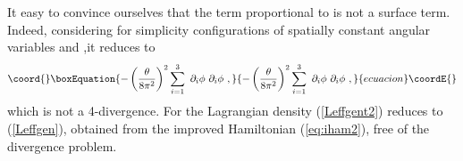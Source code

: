 \documentclass[a4paper,12pt]{article}
\begin{document}
It easy to convince ourselves that the term proportional to \coordHE{}
is not a surface term. Indeed, considering for simplicity configurations of
spatially constant angular variables \coordHE{} and
\coordHE{},it reduces to
\begin{equation}\coord{}\boxEquation{
-\left(\frac{\theta}{8\pi^2}\right)^2\sum_{i=1}^{3}\,\,
\partial_i\phi\,\, \partial_i\phi~,
}{
-\left(\frac{\theta}{8\pi^2}\right)^2\sum_{i=1}^{3}\,\,
\partial_i\phi\,\, \partial_i\phi~,
}{ecuacion}\coordE{}\end{equation}
which is not a 4-divergence.
For \coordHE{} the Lagrangian density
(\ref{Leffgent2}) reduces to (\ref{Leffgen}), obtained
from the improved  Hamiltonian (\ref{eq:iham2}),
free of the divergence problem.
\end{document}
